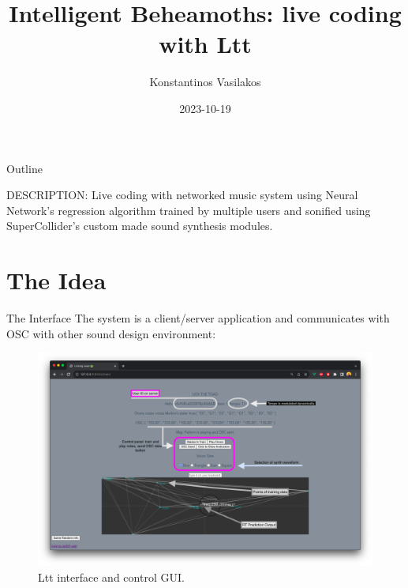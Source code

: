 \documentclass[t, 10pt, seahorse, bigger]{beamer}
\author{Konstantinos Vasilakos}
\date{2023-10-19}
\title{Intelligent Beheamoths: live coding with Ltt}
\begin{document}
\maketitle
\begin{frame}{Outline}
\tableofcontents
\end{frame}

DESCRIPTION: Live coding with networked music system using Neural Network's regression algorithm trained by multiple users and sonified using SuperCollider's custom made sound synthesis modules.
\section{The Idea}
\label{sec:orgffba941}
\begin{frame}[label={sec:org24a16af}]{The Interface}
The system is a client/server application and communicates with OSC with other sound design environment:
\begin{center}
\begin{figure}[htbp]
\centering
\includegraphics[width=.9\linewidth]{./screens/ltt-interface.png}
\caption{Ltt interface and control GUI.}
\end{figure}
\end{center}
\end{frame}
\end{document}
